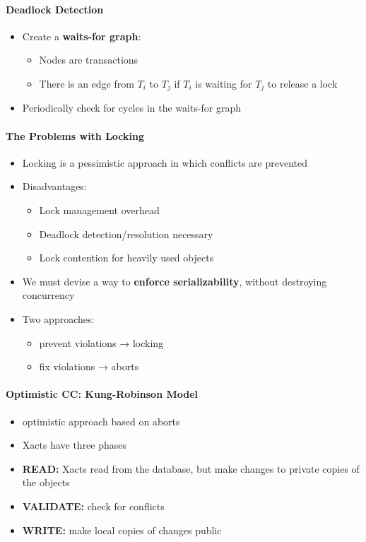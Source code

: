 \paragraph{Deadlock Detection}
\begin{itemize}
\item Create a \textbf{waits-for graph}:
  \begin{itemize}
  \item Nodes are transactions
  \item There is an edge from $T_i$ to $T_j$ if $T_i$ is waiting
    for $T_j$ to release a lock
  \end{itemize}

\item Periodically check for cycles in the waits-for graph
\end{itemize}

\paragraph{The Problems with Locking}
\begin{itemize}
\item Locking is a pessimistic approach in which conflicts are
  prevented
\item Disadvantages:
  \begin{itemize}
  \item Lock management overhead
  \item Deadlock detection/resolution necessary
  \item Lock contention for heavily used objects
  \end{itemize}

\item We must devise a way to
  \textbf{{\color{red} enforce serializability}}, without
  destroying concurrency
\item Two approaches:
  \begin{itemize}
  \item prevent violations → locking
  \item fix violations → aborts
  \end{itemize}
\end{itemize}

\paragraph{Optimistic CC: Kung-Robinson Model}
\begin{itemize}
\item optimistic approach based on aborts
\item Xacts have three phases
\item \textbf{READ:} Xacts read from the database, but
  make changes to private copies of the objects
\item \textbf{VALIDATE:} check for conflicts
\item \textbf{WRITE:} make local copies of changes public
\end{itemize}

